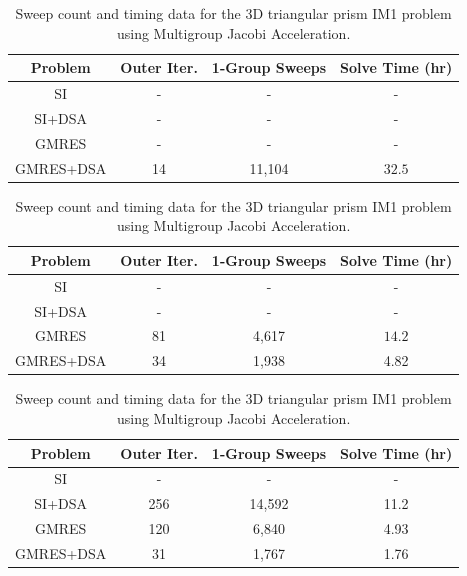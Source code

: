 \begin{table}
\caption{Sweep count and timing data for the 3D triangular prism IM1 problem using Two-Grid Acceleration.}
\centering
\def\arraystretch{1.25}
\begin{tabular}{|c|c|c|c|}
\hline
Problem & Outer Iter.  & 1-Group Sweeps & Solve Time (hr)  \\
\hline \hline
SI & - & -  & -  \\ \hline
SI+DSA & -  & - & -  \\ \hline
GMRES & -  & - & - \\ \hline
{GMRES+DSA} & {14} &  {11,104}  &  {$32.5$}  \\ \hline
\end{tabular}
\label{tab::IM1_3Dtriangle_TG}
\vspace{1.5cm}
\caption{Sweep count and timing data for the 3D triangular prism IM1 problem using Modified Two-Grid Acceleration.}
\centering
\def\arraystretch{1.25}
\begin{tabular}{|c|c|c|c|}
\hline
Problem & Outer Iter.  & 1-Group Sweeps & Solve Time (hr)  \\
\hline \hline
SI & - &  - & -  \\ \hline
SI+DSA & -  & - & -  \\ \hline
{GMRES} & {81}  & {4,617 }& {$14.2$} \\ \hline
GMRES+DSA & 34 &  1,938  &  4.82  \\ \hline
\end{tabular}
\label{tab::IM1_3Dtriangle_MTG}
\vspace{1.5cm}
\caption{Sweep count and timing data for the 3D triangular prism IM1 problem using Multigroup Jacobi Acceleration.}
\centering
\def\arraystretch{1.25}
\begin{tabular}{|c|c|c|c|}
\hline
Problem & Outer Iter.  & 1-Group Sweeps & Solve Time (hr)  \\
\hline \hline
SI &  - & - & -  \\ \hline
SI+DSA & 256 &  14,592 & 11.2 \\ \hline
{GMRES} & {120} & {6,840} & {4.93} \\ \hline
{GMRES+DSA} & {31}& {1,767} & {1.76} \\ \hline
\end{tabular}
\label{tab::IM1_3Dtriangle_MJA}
\end{table}

